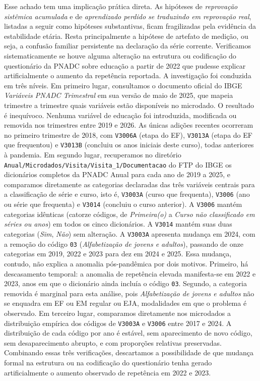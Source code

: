 Esse achado tem uma implicação prática direta. As hipóteses
de \emph{reprovação sistêmica acumulada} e de \emph{aprendizado
perdido se traduzindo em reprovação real}, listadas a seguir
como hipóteses substantivas, ficam fragilizadas pela evidência
da estabilidade etária. Resta principalmente a hipótese de
artefato de medição, ou seja, a confusão familiar persistente
na declaração da série corrente. Verificamos sistematicamente
se houve alguma alteração na estrutura ou codificação do
questionário da PNADC sobre educação a partir de 2022 que
pudesse explicar artificialmente o aumento da repetência
reportada. A investigação foi conduzida em três níveis. Em
primeiro lugar, consultamos o documento oficial do IBGE
\emph{Variáveis PNADC Trimestral} em sua versão de maio de
2025, que mapeia trimestre a trimestre quais variáveis estão
disponíveis no microdado. O resultado é inequívoco. Nenhuma
variável de educação foi introduzida, modificada ou removida
nos trimestres entre 2019 e 2026. As únicas adições recentes
ocorreram no primeiro trimestre de 2018, com
\texttt{V3006A} (etapa do EF), \texttt{V3013A} (etapa do EF
que frequentou) e \texttt{V3013B} (concluiu os anos iniciais
deste curso), todas anteriores à pandemia. Em segundo lugar,
recuperamos no diretório \texttt{Anual/Microdados/Visita/Visita\_1/Documentacao}
do FTP do IBGE os dicionários completos da PNADC Anual para
cada ano de 2019 a 2025, e comparamos diretamente as
categorias declaradas das três variáveis centrais para a
classificação de série e curso, isto é, \texttt{V3003A}
(curso que frequenta), \texttt{V3006} (ano ou série que
frequenta) e \texttt{V3014} (concluiu o curso anterior). A
\texttt{V3006} mantém categorias idênticas (catorze códigos,
de \emph{Primeira(o)} a \emph{Curso não classificado em
séries ou anos}) em todos os cinco dicionários. A
\texttt{V3014} mantém suas duas categorias (\emph{Sim},
\emph{Não}) sem alteração. A \texttt{V3003A} apresenta
mudança em 2024, com a remoção do código \texttt{03}
(\emph{Alfabetização de jovens e adultos}), passando de
onze categorias em 2019, 2022 e 2023 para dez em 2024 e
2025. Essa mudança, contudo, não explica a anomalia
pós-pandêmica por dois motivos. Primeiro, há descasamento
temporal: a anomalia de repetência elevada manifesta-se em
2022 e 2023, anos em que o dicionário ainda incluía o
código \texttt{03}. Segundo, a categoria removida é
marginal para esta análise, pois \emph{Alfabetização de
jovens e adultos} não se enquadra em EF ou EM regular ou
EJA, modalidades em que o problema é observado. Em
terceiro lugar, comparamos diretamente nos microdados a
distribuição empírica dos códigos de \texttt{V3003A} e
\texttt{V3006} entre 2017 e 2024. A distribuição de cada
código por ano é estável, sem aparecimento de novo código,
sem desaparecimento abrupto, e com proporções relativas
preservadas. Combinando essas três verificações,
descartamos a possibilidade de que mudança formal na
estrutura ou na codificação do questionário tenha gerado
artificialmente o aumento observado de repetência em 2022 e
2023.

